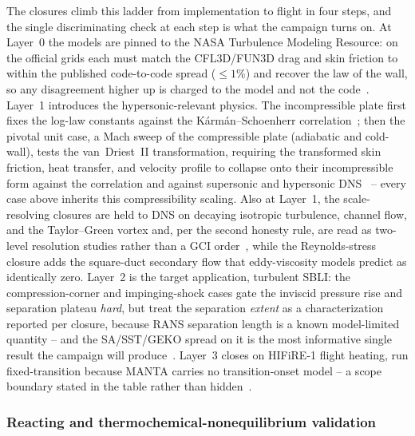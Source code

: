 \documentclass[journal,biblatex]{new-aiaa}
\begin{document}
The closures climb this ladder from implementation to flight in four steps, and the single discriminating check at each step is what the campaign turns on. At Layer~0 the models are pinned to the NASA Turbulence Modeling Resource: on the official grids each must match the CFL3D/FUN3D drag and skin friction to within the published code-to-code spread ($\le1\%$) and recover the law of the wall, so any disagreement higher up is charged to the model and not the code~\cite{noauthor_turbulence_nodate}. Layer~1 introduces the hypersonic-relevant physics. The incompressible plate first fixes the log-law constants against the Kármán--Schoenherr correlation~\cite{white_viscous_2005}; then the pivotal unit case, a Mach sweep of the compressible plate (adiabatic and cold-wall), tests the van~Driest~II transformation, requiring the transformed skin friction, heat transfer, and velocity profile to collapse onto their incompressible form against the correlation and against supersonic and hypersonic DNS~\cite{van_driest_investigation_1952,pirozzoli_direct_2011,zhang_direct_2018} -- every case above inherits this compressibility scaling. Also at Layer~1, the scale-resolving closures are held to DNS on decaying isotropic turbulence, channel flow, and the Taylor--Green vortex and, per the second honesty rule, are read as two-level resolution studies rather than a GCI order~\cite{comte-bellot_simple_1971,moser_direct_1999,lee_direct_2015,engelmann_direct_2023}, while the Reynolds-stress closure adds the square-duct secondary flow that eddy-viscosity models predict as identically zero. Layer~2 is the target application, turbulent SBLI: the compression-corner and impinging-shock cases gate the inviscid pressure rise and separation plateau \emph{hard}, but treat the separation \emph{extent} as a characterization reported per closure, because RANS separation length is a known model-limited quantity -- and the SA/SST/GEKO spread on it is the most informative single result the campaign will produce~\cite{settles_incipient_1976,schulein_skin_2006}. Layer~3 closes on HIFiRE-1 flight heating, run fixed-transition because MANTA carries no transition-onset model -- a scope boundary stated in the table rather than hidden~\cite{wadhams_ground_2008,maclean_ground_2008}.

\subsubsection{Reacting and thermochemical-nonequilibrium validation}
\end{document}
